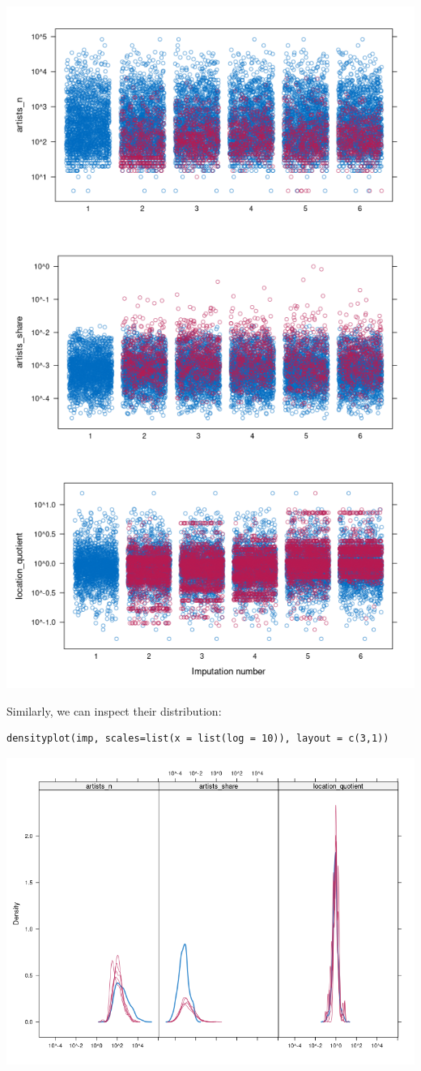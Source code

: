 \documentclass[8pt]{article}
\begin{document}
\begin{center}
\includegraphics[width=.9\linewidth]{media/diag_range.png}
\end{center}

Similarly, we can inspect their distribution:
\begin{verbatim}
densityplot(imp, scales=list(x = list(log = 10)), layout = c(3,1))
\end{verbatim}

\begin{center}
\includegraphics[width=.9\linewidth]{media/diag_dens.png}
\end{center}
\begin{latex}
\pagebreak
\end{latex}
\end{document}
